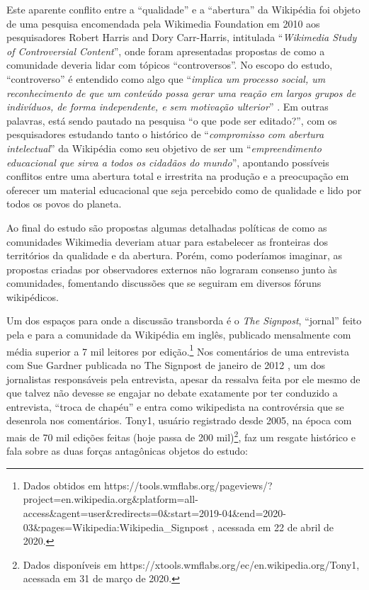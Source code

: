 Este aparente conflito entre a ``qualidade'' e a ``abertura'' da Wikipédia foi objeto de uma pesquisa encomendada pela Wikimedia Foundation em 2010 aos pesquisadores Robert Harris and Dory Carr-Harris, intitulada ``\textit{Wikimedia Study of Controversial Content}'', onde foram apresentadas propostas de como a comunidade deveria lidar com tópicos ``controversos''. No escopo do estudo, ``controverso'' é entendido como algo que ``\textit{implica um processo social, um reconhecimento de que um conteúdo possa gerar uma reação em largos grupos de indivíduos, de forma independente, e sem motivação ulterior}'' \citep{harris_2010_2010}. Em outras palavras, está sendo pautado na pesquisa ``o que pode ser editado?'', com os pesquisadores estudando tanto o histórico de ``\textit{compromisso com abertura intelectual}'' da Wikipédia como seu objetivo de ser um ``\textit{empreendimento educacional que sirva a todos os cidadãos do mundo}'', apontando possíveis conflitos entre uma abertura total e irrestrita na produção e a preocupação em oferecer um material educacional que seja percebido como de qualidade e lido por todos os povos do planeta.

Ao final do estudo são propostas algumas detalhadas políticas de como as comunidades Wikimedia deveriam atuar para estabelecer as fronteiras dos territórios da qualidade e da abertura. Porém, como poderíamos imaginar, as propostas criadas por observadores externos não lograram consenso junto às comunidades, fomentando discussões que se seguiram em diversos fóruns wikipédicos.

Um dos espaços para onde a discussão transborda é o \textit{The Signpost}, ``jornal'' feito pela e para a comunidade da Wikipédia em inglês, publicado mensalmente com média superior a 7 mil leitores por edição.\footnote{Dados obtidos em https://tools.wmflabs.org/pageviews/?project=en.wikipedia.org\&platform=all-access\&agent=user\&redirects=0\&start=2019-04\&end=2020-03\&pages=Wikipedia:Wikipedia\_Signpost , acessada em 22 de abril de 2020.} Nos comentários de uma entrevista com Sue Gardner publicada no The Signpost de janeiro de 2012 , um dos jornalistas responsáveis  pela entrevista, apesar da ressalva feita por ele mesmo de que talvez não devesse se engajar no debate exatamente por ter conduzido a entrevista, ``troca de chapéu'' e entra como wikipedista na controvérsia que se desenrola nos comentários. Tony1, usuário registrado desde 2005, na época com mais de 70 mil edições feitas (hoje passa de 200 mil)\footnote{Dados disponíveis em  https://xtools.wmflabs.org/ec/en.wikipedia.org/Tony1, acessada em 31 de março de 2020.}, faz um resgate histórico e fala sobre as duas forças antagônicas objetos do estudo:

